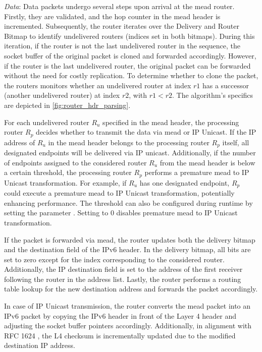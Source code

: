 \textit{Data}: Data packets undergo several steps upon arrival at the \gls{mead}
    router.
Firstly, they are validated, and the hop counter in the \gls{mead} header is
    incremented.
Subsequently, the router iterates over the Delivery and Router Bitmap to
    identify undelivered routers (indices set in both bitmaps).
During this iteration, if the router is not the last undelivered router in the
    sequence, the socket buffer of the original packet is cloned and forwarded
    accordingly.
However, if the router is the last undelivered router, the original packet can
    be forwarded without the need for costly replication.
To determine whether to clone the packet, the routers monitors whether an 
    undelivered router at index $r1$ has a successor (another undelivered
    router) at index $r2$, with $r1 < r2$.
The algorithm's specifics are depicted in \autoref{fig:router_hdr_parsing}.

For each undelivered router $R_u$ specified in the \gls{mead} header, the
    processing router $R_p$ decides whether to transmit the data via \gls{mead}
    or IP Unicast.
If the IP address of $R_u$ in the \gls{mead} header belongs to the processing
    router $R_p$ itself, all designated endpoints will be delivered via IP
    unicast.
Additionally, if the number of endpoints assigned to the considered router
    $R_u$ from the \gls{mead} header is below a certain threshold, the processing
    router $R_p$ performs a premature \gls{mead} to IP Unicast transformation.
For example, if $R_u$ has one designated endpoint, $R_p$ could execute a
    premature \gls{mead} to IP Unicast transformation, potentially enhancing
    performance.
The threshold can also be configured during runtime by setting the parameter
    .
Setting  to 0 disables premature \gls{mead} to IP Unicast
    transformation.

If the packet is forwarded via \gls{mead}, the router updates both the delivery
    bitmap and the destination field of the IPv6 header.
In the delivery bitmap, all bits are set to zero except for the index
    corresponding to the considered router.
Additionally, the IP destination field is set to the address of the first
    receiver following the router in the address list.
Lastly, the router performs a routing table lookup for the new destination
    address and forwards the packet accordingly.

In case of IP Unicast transmission, the router converts the \gls{mead} packet
    into an IPv6 packet by copying the IPv6 header in front of the Layer 4
    header and adjusting the socket buffer pointers accordingly.
Additionally, in alignment with RFC 1624 \cite{rfc1624}, the L4 checksum is
    incrementally updated due to the modified destination IP address.

